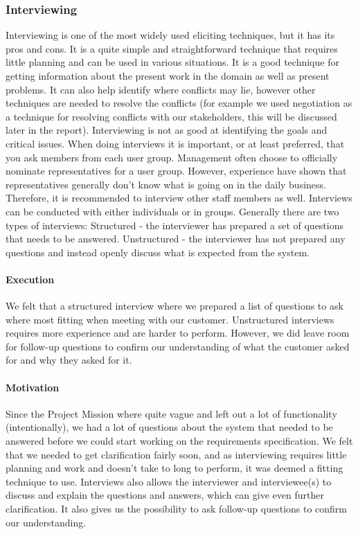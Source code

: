 \documentclass[10pt]{article}
\begin{document}
\subsubsection{Interviewing}
Interviewing is one of the most widely used eliciting techniques, but it has its pros and cons. It is a quite simple and straightforward technique that requires little planning and can be used in various situations. It is a good technique for getting information about the present work in the domain as well as present problems. It can also help identify where conflicts may lie, however other techniques are needed to resolve the conflicts (for example we used negotiation as a technique for resolving conflicts with our stakeholders, this will be discussed later in the report). Interviewing is not as good at identifying the goals and critical issues.
When doing interviews it is important, or at least preferred, that you ask members from each user group. Management often choose to officially nominate representatives for a user group. However, experience have shown that representatives generally don’t know what is going on in the daily business. Therefore, it is recommended to interview other staff members as well. Interviews can be conducted with either individuals or in groups.
Generally there are two types of interviews: 
Structured -  the interviewer has prepared a set of questions that needs to be answered. 
Unstructured - the interviewer has not prepared any questions and instead openly discuss what is expected from the system. 
\paragraph{Execution}
\hfill \break
We felt that a structured interview where we prepared a list of questions to ask where most fitting when meeting with our customer. Unstructured interviews requires more experience and are harder to perform. However, we did leave room for follow-up questions to confirm our understanding of what the customer asked for and why they asked for it. 
\paragraph{Motivation}
\hfill \break
Since the Project Mission where quite vague and left out a lot of functionality (intentionally), we had a lot of questions about the system that needed to be answered before we could start working on the requirements specification. We felt that we needed to get clarification fairly soon, and as interviewing requires little planning and work and doesn’t take to long to perform, it was deemed a fitting technique to use. Interviews also allows the interviewer and interviewee(s) to discuss and explain the questions and answers, which can give even further clarification. It also gives us the possibility to ask follow-up questions to confirm our understanding. 
\end{document}
